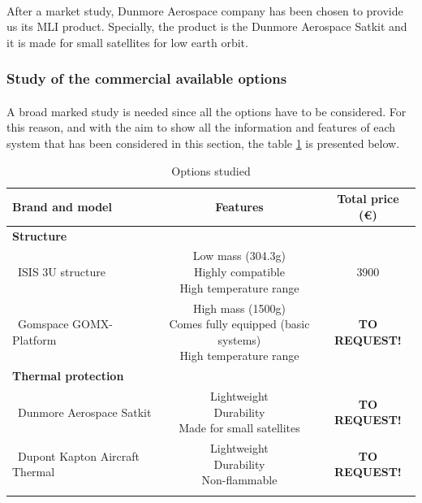 \paragraph{} 
After a market study, Dunmore Aerospace company has been chosen to provide us its MLI product. Specially, the product is the Dunmore Aerospace Satkit and it is made for small satellites for low earth orbit.

\subsubsection{Study of the commercial available options}
\paragraph{}A broad marked study is needed since all the options have to be considered. For this reason, and with the aim to show all the information and features of each system that has been considered in this section, the table \ref{structureoptions} is presented below.


\begin{longtable}{| l | c | c | }
\hline
\rowcolor[gray]{0.80}	\textbf{Brand and model} &  \textbf{Features}     & \textbf{Total price (\euro)}   \\
\hline
\endfirsthead

\rowcolor[gray]{0.85} \textbf{Structure} &  &  \\
	   ~ISIS 3U structure & \makecell{Low mass (304.3g) \\ Highly compatible \\ High temperature range} & 3900 \\
	   \hline
	   ~Gomspace GOMX-Platform & \makecell{High mass (1500g) \\ Comes fully equipped (basic systems) \\ High temperature range} & \textbf{TO REQUEST!} \\
	   \hline
\rowcolor[gray]{0.85} \textbf{Thermal protection} &  &  \\
	   ~Dunmore Aerospace Satkit & \makecell{Lightweight \\ Durability \\ Made for small satellites}& \textbf{TO REQUEST!} \\
	   \hline
	   ~Dupont Kapton Aircraft Thermal & \makecell{Lightweight \\ Durability \\ Non-flammable} & \textbf{TO REQUEST!} \\
	\hline

\caption{Options studied}
\label{structureoptions}
\end{longtable}

